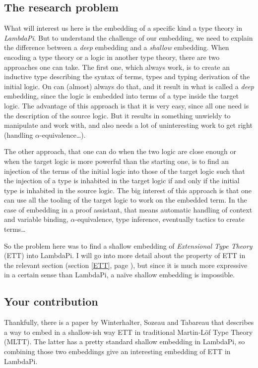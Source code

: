 \subsection*{The research problem}

What will interest us here is the embedding of a specific kind a type theory in
\emph{LambdaPi}. But to understand the challenge of our embedding, we need to
explain the difference between a \emph{deep} embedding and a \emph{shallow}
embedding. When encoding a type theory or a logic in another type theory, there
are two approaches one can take.  The first one, which always work, is to create
an inductive type describing the syntax of terms, types and typing derivation of
the initial logic. On can (almost) always do that, and it result in what is
called a \emph{deep} embedding, since the logic is embedded into terms of a type
inside the target logic.  The advantage of this approach is that it is very
easy, since all one need is the description of the source logic. But it results
in something unwieldy to manipulate and work with, and also needs a lot of
uninteresting work to get right (handling $\alpha$-equivalence\dots).

The other approach, that one can do when the two logic are close enough or when
the target logic is more powerful than the starting one, is to find an injection
of the terms of the initial logic into those of the target logic such that the
injection of a type is inhabited in the target logic if and only if the initial
type is inhabited in the source logic.  The big interest of this approach is
that one can use all the tooling of the target logic to work on the embedded
term. In the case of embedding in a proof assistant, that means automatic
handling of context and variable binding, $\alpha$-equivalence, type inference,
eventually tactics to create terms\dots

So the problem here was to find a shallow embedding of \emph{Extensional Type
Theory} (ETT) into LambdaPi. I will go into more detail about the property of
ETT in the relevant section (section \ref{ETT}, page \pageref{ETT}), but since
it is much more expressive in a certain sense than LambdaPi, a naïve shallow
embedding is impossible.

\thispagestyle{empty}
\subsection*{Your contribution}

Thankfully, there is a paper by Winterhalter, Sozeau and
Tabareau\cite{winterhalter_eliminating_2019} that describes a way to embed in a
shallow-ish way ETT in traditional Martin-Löf Type Theory (MLTT). The latter has a
pretty standard shallow embedding in LambdaPi, so combining those two embeddings
give an interesting embedding of ETT in LambdaPi.

